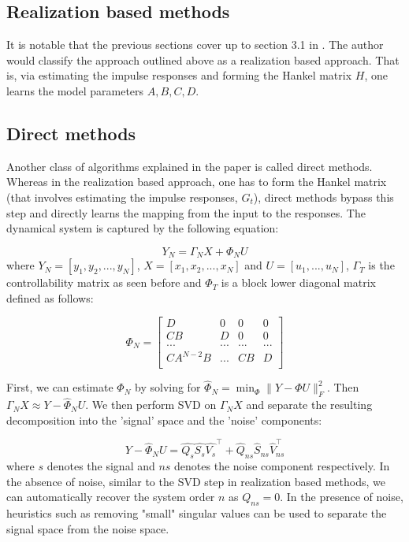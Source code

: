 \documentclass{article}[12pt]
\begin{document}
\subsection{Realization based methods}
It is notable that the previous sections cover up to section 3.1 in \cite{Viberg:1995:SMI:222618.222630}. The author would classify the approach outlined above as a realization based approach. That is, via estimating the impulse responses and forming the Hankel matrix $H$, one learns the model parameters $A, B, C, D$. 

\subsection{Direct methods}
Another class of algorithms explained in the paper is called direct methods. Whereas in the realization based approach, one has to form the Hankel matrix (that involves estimating the impulse responses, $G_t$), direct methods bypass this step and directly learns the mapping from the input to the responses. The dynamical system is captured by the following equation:

\begin{equation}
    Y_N = \Gamma_N X + \Phi_N U
    \label{eq:direct-method-system-eqn}
\end{equation}
where $Y_N = [y_1, y_2, ..., y_N]$, $X = [x_1, x_2,..., x_N]$ and $U = [u_1, ..., u_N]$, $\Gamma_T$ is the controllability matrix as seen before and $\Phi_T$ is a block lower diagonal matrix defined as follows:

\begin{equation*}
    \Phi_N = \begin{bmatrix}
    D &0 &0 &0\\
    CB &D &0 &0\\
    ... &... &... &...\\
    CA^{N-2}B &... &CB &D\\
    \end{bmatrix}
\end{equation*}

First, we can estimate $\Phi_N$ by solving for $\hat{\Phi}_N = \min_\Phi \rVert Y - \Phi U\rVert_F^2$. Then $\Gamma_N X \approx Y - \hat{\Phi}_N U$. We then perform SVD on  $\Gamma_N X$ and separate the resulting decomposition into the 'signal' space and the 'noise' components:

$$Y - \hat{\Phi}_N U = \hat{Q_s}\hat{S_s}\hat{V_s}^\top + \hat{Q}_{ns}\hat{S}_{ns}\hat{V}_{ns}^\top $$ where $s$ denotes the signal and $ns$ denotes the noise component respectively. In the absence of noise, similar to the SVD step in realization based methods, we can automatically recover the system order $n$ as $Q_{ns} = 0$. In the presence of noise, heuristics such as removing "small" singular values can be used to separate the signal space from the noise space.
\end{document}
